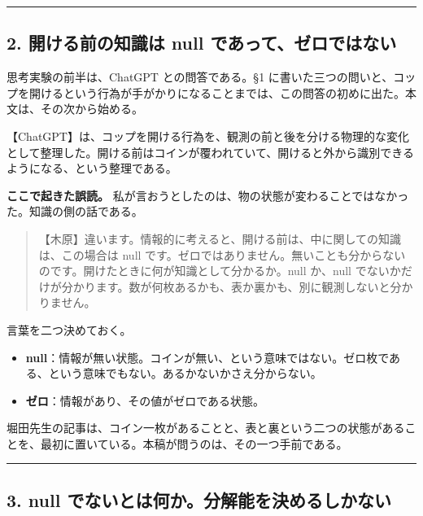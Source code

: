 \documentclass[
  a4paper,
]{ltjsarticle}
\providecommand{\tightlist}{%
  \setlength{\itemsep}{0pt}\setlength{\parskip}{0pt}}
\begin{document}
\begin{center}\rule{0.5\linewidth}{0.5pt}\end{center}

\subsection{2. 開ける前の知識は null
であって、ゼロではない}\label{ux958bux3051ux308bux524dux306eux77e5ux8b58ux306f-null-ux3067ux3042ux3063ux3066ux30bcux30edux3067ux306fux306aux3044}

思考実験の前半は、ChatGPT との問答である。§1
に書いた三つの問いと、コップを開けるという行為が手がかりになることまでは、この問答の初めに出た。本文は、その次から始める。

【ChatGPT】は、コップを開ける行為を、観測の前と後を分ける物理的な変化として整理した。開ける前はコインが覆われていて、開けると外から識別できるようになる、という整理である。

\textbf{ここで起きた誤読。}
私が言おうとしたのは、物の状態が変わることではなかった。知識の側の話である。

\begin{quote}
【木原】違います。情報的に考えると、開ける前は、中に関しての知識は、この場合は
null
です。ゼロではありません。無いことも分からないのです。開けたときに何が知識として分かるか。null
か、null
でないかだけが分かります。数が何枚あるかも、表か裏かも、別に観測しないと分かりません。
\end{quote}

言葉を二つ決めておく。

\begin{itemize}
\tightlist
\item
  \textbf{null}：情報が無い状態。コインが無い、という意味ではない。ゼロ枚である、という意味でもない。あるかないかさえ分からない。
\item
  \textbf{ゼロ}：情報があり、その値がゼロである状態。
\end{itemize}

堀田先生の記事は、コイン一枚があることと、表と裏という二つの状態があることを、最初に置いている。本稿が問うのは、その一つ手前である。

\begin{center}\rule{0.5\linewidth}{0.5pt}\end{center}

\subsection{3. null
でないとは何か。分解能を決めるしかない}\label{null-ux3067ux306aux3044ux3068ux306fux4f55ux304bux5206ux89e3ux80fdux3092ux6c7aux3081ux308bux3057ux304bux306aux3044}
\end{document}
